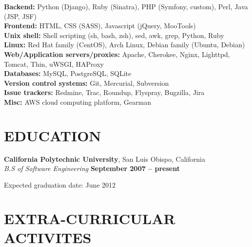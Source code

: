 \documentclass[margin,line]{resume}
\begin{document}
\begin{resume}
    \textbf{Backend:} Python (Django), Ruby (Sinatra), PHP (Symfony, custom), Perl, Java (JSP, JSF)\\
    \textbf{Frontend:} HTML, CSS (SASS), Javascript (jQuery, MooTools)\\
    \textbf{Unix shell:} Shell scripting (sh, bash, zsh), sed, awk, grep, Python, Ruby\\
    \textbf{Linux:} Red Hat family (CentOS), Arch Linux, Debian family (Ubuntu, Debian)\\
    \textbf{Web/Application servers/proxies:} Apache, Cherokee, Nginx, Lighttpd, Tomcat, Thin, uWSGI, HAProxy\\
    \textbf{Databases:} MySQL, PostgreSQL, SQLite\\
    \textbf{Version control systems:} Git, Mercurial, Subversion\\
    \textbf{Issue trackers:} Redmine, Trac, Roundup, Flyspray, Bugzilla, Jira\\
    \textbf{Misc:} AWS cloud computing platform, Gearman

\sectionline

    \section{\mysidestyle \textbf{\large{E}\small{DUCATION}}}

    \textbf{\listing California Polytechnic University}, San Luis Obispo, California \vspace{2mm}\\\vspace{1mm}%
    \textsl{B.S of Software Engineering} \hfill \textbf{ September 2007 -- present}\vspace{-3mm}\\\vspace{-1mm}%
    \begin{list2}
        \item Expected graduation date: June 2012
    \end{list2}\vspace{-1.5mm}


\sectionline

    \section{\mysidestyle \textbf{\large{E}\small{XTRA-CURRICULAR ACTIVITES}}}


\end{resume}
\end{document}

